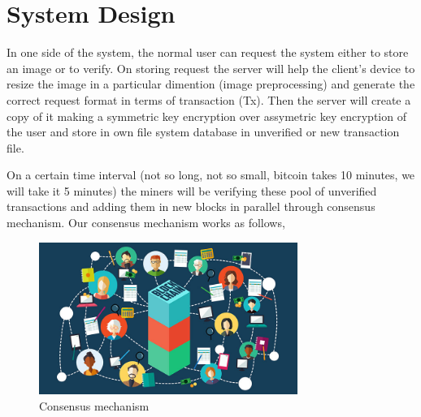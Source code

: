 \section{System Design}
In one side of the system, the normal user can request the system either to store an image or to verify. On storing request the server will help the client's device to resize the image in a particular dimention (image preprocessing) and generate the correct request format in terms of transaction (Tx). Then the server will create a copy of it making a symmetric key encryption over assymetric key encryption of the user and store in own file system database in unverified or new transaction file.

On a certain time interval (not so long, not so small, bitcoin takes 10 minutes, we will take it 5 minutes) the miners will be verifying these pool of unverified transactions and adding them in new blocks in parallel through consensus mechanism. Our consensus mechanism works as follows,

\begin{figure}
\begin{center}
\includegraphics[width=0.75\textwidth]{./img_src/blockchain_network.jpg}
\end{center}
\caption{Consensus mechanism}
\end{figure}

